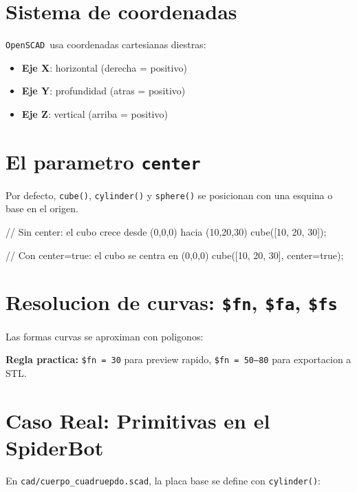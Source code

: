 \documentclass[12pt, oneside, a4paper]{report}
\newcommand{\openscadlogo}{\texttt{OpenSCAD}}
\newcommand{\codigo}[1]{\texttt{#1}}
\begin{document}
\section{Sistema de coordenadas}
\openscadlogo\ usa coordenadas cartesianas diestras:
\begin{itemize}
    \item \textbf{Eje X}: horizontal (derecha = positivo)
    \item \textbf{Eje Y}: profundidad (atras = positivo)
    \item \textbf{Eje Z}: vertical (arriba = positivo)
\end{itemize}

\section{El parametro \codigo{center}}
Por defecto, \codigo{cube()}, \codigo{cylinder()} y \codigo{sphere()} se posicionan con una esquina o base en el origen.

\begin{openscad}
// Sin center: el cubo crece desde (0,0,0) hacia (10,20,30)
cube([10, 20, 30]);

// Con center=true: el cubo se centra en (0,0,0)
cube([10, 20, 30], center=true);
\end{openscad}

\section{Resolucion de curvas: \codigo{\$fn}, \codigo{\$fa}, \codigo{\$fs}}
Las formas curvas se aproximan con poligonos:


\textbf{Regla practica:} \codigo{\$fn = 30} para preview rapido, \codigo{\$fn = 50--80} para exportacion a STL.

\section{Caso Real: Primitivas en el SpiderBot}
En \codigo{cad/cuerpo\_cuadruepdo.scad}, la placa base se define con \codigo{cylinder()}:
\end{document}
